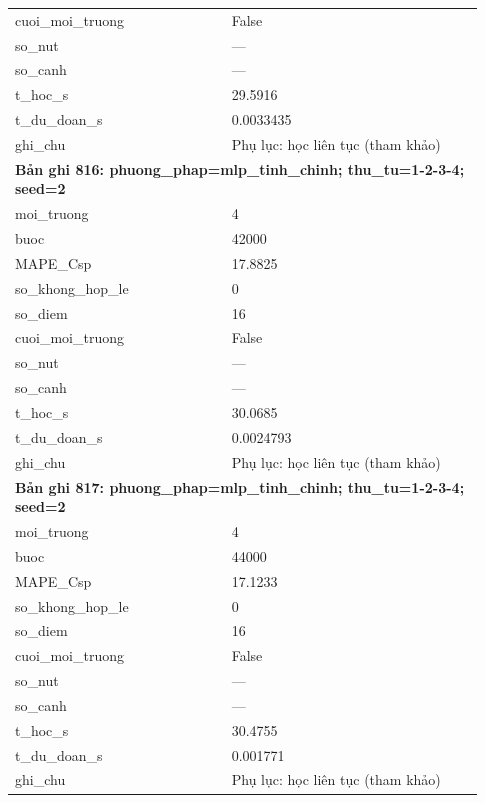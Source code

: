 \begin{longtable}{p{0.43\linewidth}p{0.50\linewidth}}
cuoi\_\allowbreak moi\_\allowbreak truong & False \\
so\_\allowbreak nut & — \\
so\_\allowbreak canh & — \\
t\_\allowbreak hoc\_\allowbreak s & 29.5916 \\
t\_\allowbreak du\_\allowbreak doan\_\allowbreak s & 0.0033435 \\
ghi\_\allowbreak chu & Phụ lục: học liên tục (tham khảo) \\
\midrule
\multicolumn{2}{p{0.95\linewidth}}{\textbf{Bản ghi 816: phuong\_phap=mlp\_tinh\_chinh; thu\_tu=1-2-3-4; seed=2}} \\
moi\_\allowbreak truong & 4 \\
buoc & 42000 \\
MAPE\_\allowbreak Csp & 17.8825 \\
so\_\allowbreak khong\_\allowbreak hop\_\allowbreak le & 0 \\
so\_\allowbreak diem & 16 \\
cuoi\_\allowbreak moi\_\allowbreak truong & False \\
so\_\allowbreak nut & — \\
so\_\allowbreak canh & — \\
t\_\allowbreak hoc\_\allowbreak s & 30.0685 \\
t\_\allowbreak du\_\allowbreak doan\_\allowbreak s & 0.0024793 \\
ghi\_\allowbreak chu & Phụ lục: học liên tục (tham khảo) \\
\midrule
\multicolumn{2}{p{0.95\linewidth}}{\textbf{Bản ghi 817: phuong\_phap=mlp\_tinh\_chinh; thu\_tu=1-2-3-4; seed=2}} \\
moi\_\allowbreak truong & 4 \\
buoc & 44000 \\
MAPE\_\allowbreak Csp & 17.1233 \\
so\_\allowbreak khong\_\allowbreak hop\_\allowbreak le & 0 \\
so\_\allowbreak diem & 16 \\
cuoi\_\allowbreak moi\_\allowbreak truong & False \\
so\_\allowbreak nut & — \\
so\_\allowbreak canh & — \\
t\_\allowbreak hoc\_\allowbreak s & 30.4755 \\
t\_\allowbreak du\_\allowbreak doan\_\allowbreak s & 0.001771 \\
ghi\_\allowbreak chu & Phụ lục: học liên tục (tham khảo) \\

\end{longtable}

